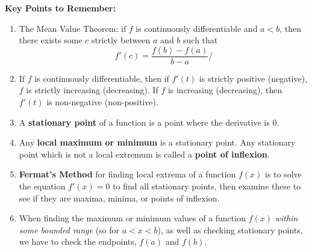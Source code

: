 \documentclass{article}
\begin{document}
\clearpage




{\bf Key Points to Remember:}

\vspace{5mm}

\begin{enumerate}
	\item The Mean Value Theorem: if $f$ is continuously differentiable and $a<b$, then there exists some $c$ strictly between $a$ and $b$ such that
		\[f'(c)=\frac{f(b)-f(a)}{b-a}/\]
	\item If $f$ is continuously differentiable, then if $f'(t)$ is strictly positive (negative), $f$ is strictly increasing (decreasing). If $f$ is increasing (decreasing), then $f'(t)$ is non-negative (non-positive).
	\item A \textbf{stationary point} of a function is a point where the derivative is 0.
	\item Any \textbf{local maximum or minimum} is a stationary point. Any stationary point which is not a local extremum is called a \textbf{point of inflexion}.
	\item \textbf{Fermat's Method} for finding local extrema of a function $f(x)$ is to solve the equation $f'(x)=0$ to find all stationary points, then examine these to see if they are maxima, minima, or points of inflexion.
	\item When finding the maximum or minimum values of a function $f(x)$ \textit{within some bounded range} (so for $a<x<b$), as well as checking stationary points, we have to check the endpoints, $f(a)$ and $f(b)$.
\end{enumerate}
\end{document}
